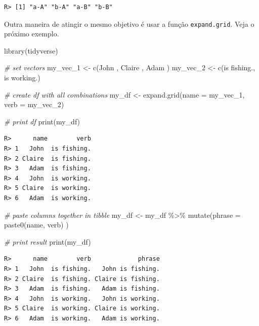 \documentclass[
  11pt,
]{book}
\newenvironment{Shaded}{\begin{snugshade}}{\end{snugshade}}
\newcommand{\AttributeTok}[1]{\textcolor[rgb]{0.61,0.61,0.61}{#1}}
\newcommand{\CommentTok}[1]{\textcolor[rgb]{0.37,0.37,0.37}{\textit{#1}}}
\newcommand{\FunctionTok}[1]{\textcolor[rgb]{0,0,0}{#1}}
\newcommand{\NormalTok}[1]{#1}
\newcommand{\OtherTok}[1]{\textcolor[rgb]{0.37,0.37,0.37}{#1}}
\newcommand{\SpecialCharTok}[1]{\textcolor[rgb]{0,0,0}{#1}}
\newcommand{\StringTok}[1]{\textcolor[rgb]{0.5,0.5,0.5}{#1}}
\begin{document}
\begin{verbatim}
R> [1] "a-A" "b-A" "a-B" "b-B"
\end{verbatim}

Outra maneira de atingir o mesmo objetivo é usar a função \texttt{expand.grid}. Veja o próximo exemplo.

\begin{Shaded}
\begin{Highlighting}[]
\FunctionTok{library}\NormalTok{(tidyverse)}

\CommentTok{\# set vectors}
\NormalTok{my\_vec\_1 }\OtherTok{\textless{}{-}} \FunctionTok{c}\NormalTok{(}\StringTok{\textquotesingle{}John \textquotesingle{}}\NormalTok{, }\StringTok{\textquotesingle{}Claire \textquotesingle{}}\NormalTok{, }\StringTok{\textquotesingle{}Adam \textquotesingle{}}\NormalTok{)}
\NormalTok{my\_vec\_2 }\OtherTok{\textless{}{-}} \FunctionTok{c}\NormalTok{(}\StringTok{\textquotesingle{}is fishing.\textquotesingle{}}\NormalTok{, }\StringTok{\textquotesingle{}is working.\textquotesingle{}}\NormalTok{)}

\CommentTok{\# create df with all combinations}
\NormalTok{my\_df }\OtherTok{\textless{}{-}} \FunctionTok{expand.grid}\NormalTok{(}\AttributeTok{name =}\NormalTok{ my\_vec\_1,}
                     \AttributeTok{verb =}\NormalTok{ my\_vec\_2)}

\CommentTok{\# print df}
\FunctionTok{print}\NormalTok{(my\_df)}
\end{Highlighting}
\end{Shaded}

\begin{verbatim}
R>      name        verb
R> 1   John  is fishing.
R> 2 Claire  is fishing.
R> 3   Adam  is fishing.
R> 4   John  is working.
R> 5 Claire  is working.
R> 6   Adam  is working.
\end{verbatim}

\begin{Shaded}
\begin{Highlighting}[]
\CommentTok{\# paste columns together in tibble}
\NormalTok{my\_df }\OtherTok{\textless{}{-}}\NormalTok{ my\_df }\SpecialCharTok{\%\textgreater{}\%}
  \FunctionTok{mutate}\NormalTok{(}\AttributeTok{phrase =} \FunctionTok{paste0}\NormalTok{(name, verb) )}

\CommentTok{\# print result}
\FunctionTok{print}\NormalTok{(my\_df)}
\end{Highlighting}
\end{Shaded}

\begin{verbatim}
R>      name        verb             phrase
R> 1   John  is fishing.   John is fishing.
R> 2 Claire  is fishing. Claire is fishing.
R> 3   Adam  is fishing.   Adam is fishing.
R> 4   John  is working.   John is working.
R> 5 Claire  is working. Claire is working.
R> 6   Adam  is working.   Adam is working.
\end{verbatim}
\end{document}
